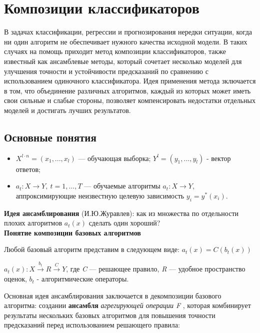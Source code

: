 \section{Композиции классификаторов}

В задачах классификации, регрессии и прогнозирования нередки ситуации,    когда ни один алгоритм не обеспечивает нужного качества исходной модели.  В таких случаях на помощь приходит метод композиции классификаторов, также известный как ансамблевые методы, который сочетает несколько моделей для улучшения точности и устойчивости предсказаний по сравнению с использованием одиночного классификатора. Идея применения метода зключается в том, что объединение различных алгоритмов, каждый из которых может иметь свои сильные и слабые стороны, позволяет компенсировать недостатки отдельных моделей и достигать лучших результатов.

\subsection{Основные понятия}

\begin{itemize}
    \item $X^{l \cdot n} = (x_1, ... , x_\textit{l})$ --- обучающая выборка; $Y^\textit{l} = (y_1, ... , y_\textit{l})$ - вектор ответов;
    \item $a_t: X \to Y, \ t = 1, \dots, T$ --- обучаемые алгоритмы $a_t: X \to Y$, аппроксимирующие неизвестную целевую зависимость $y_i = y^*(x_i)$.
\end{itemize}
\textbf{Идея ансамблирования} (И.Ю.Журавлев): как из множества по отдельности плохих алгоритмов \textit{$ a_t(x) $} сделать один хороший?\\

\textbf{Понятие композиции базовых алгоритмов}

Любой базовый алгоритм представим в следующем виде: $ a_t(x) = C(b_t(x))$

$a_t(x): \textit{X}  \overset{b_t}{\longrightarrow} \textit{R} \overset{C}{\longrightarrow} \textit{Y}$, где \textit{C} --- решающее правило, \textit{R} --- удобное пространство оценок, $b_t$ - алгоритмические операторы.

Основная идея ансамблирования заключается в декомпозиции базового алгоритма: создании \textbf{ансамбля} \textit{агрегирующей операции F }, которая комбинирует результаты нескольких базовых алгоритмов для повышения точности предсказаний перед использованием решающего правила:

